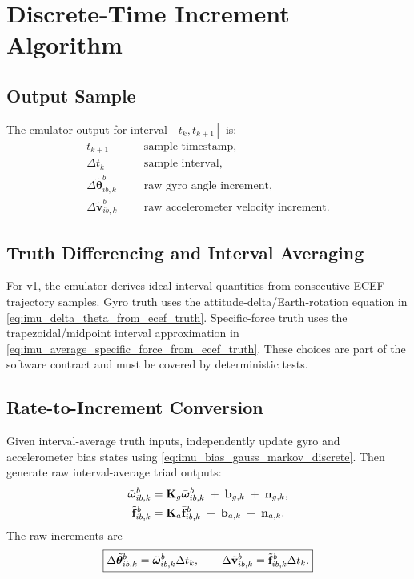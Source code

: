 \chapter{Discrete-Time Increment Algorithm}

\section{Output Sample}

The emulator output for interval $[t_k,t_{k+1}]$ is:
\begin{align}
t_{k+1} & && \text{sample timestamp},\\
\Delta t_k & && \text{sample interval},\\
\Delta\tilde{\boldsymbol{\theta}}_{ib,k}^{b}
& && \text{raw gyro angle increment},\\
\Delta\tilde{\mathbf{v}}_{ib,k}^{b}
& && \text{raw accelerometer velocity increment}.
\end{align}

\section{Truth Differencing and Interval Averaging}

For v1, the emulator derives ideal interval quantities from consecutive ECEF
trajectory samples. Gyro truth uses the attitude-delta/Earth-rotation equation
in \cref{eq:imu_delta_theta_from_ecef_truth}. Specific-force truth uses the
trapezoidal/midpoint interval approximation in
\cref{eq:imu_average_specific_force_from_ecef_truth}. These choices are part of
the software contract and must be covered by deterministic tests.

\section{Rate-to-Increment Conversion}

Given interval-average truth inputs, independently update gyro and accelerometer
bias states using \cref{eq:imu_bias_gauss_markov_discrete}. Then generate raw
interval-average triad outputs:
\begin{align}
\tilde{\boldsymbol{\omega}}_{ib,k}^{b}
&=
\mathbf{K}_g\bar{\boldsymbol{\omega}}_{ib,k}^{b}
\;+\;
\mathbf{b}_{g,k}
\;+\;
\mathbf{n}_{g,k},\\
\tilde{\mathbf{f}}_{ib,k}^{b}
&=
\mathbf{K}_a\bar{\mathbf{f}}_{ib,k}^{b}
\;+\;
\mathbf{b}_{a,k}
\;+\;
\mathbf{n}_{a,k}.
\end{align}
The raw increments are
\begin{equation}
\boxed{
\Delta\tilde{\boldsymbol{\theta}}_{ib,k}^{b}
=
\tilde{\boldsymbol{\omega}}_{ib,k}^{b}\Delta t_k,
\qquad
\Delta\tilde{\mathbf{v}}_{ib,k}^{b}
=
\tilde{\mathbf{f}}_{ib,k}^{b}\Delta t_k.
}
\label{eq:imu_raw_increment_generation}
\end{equation}

